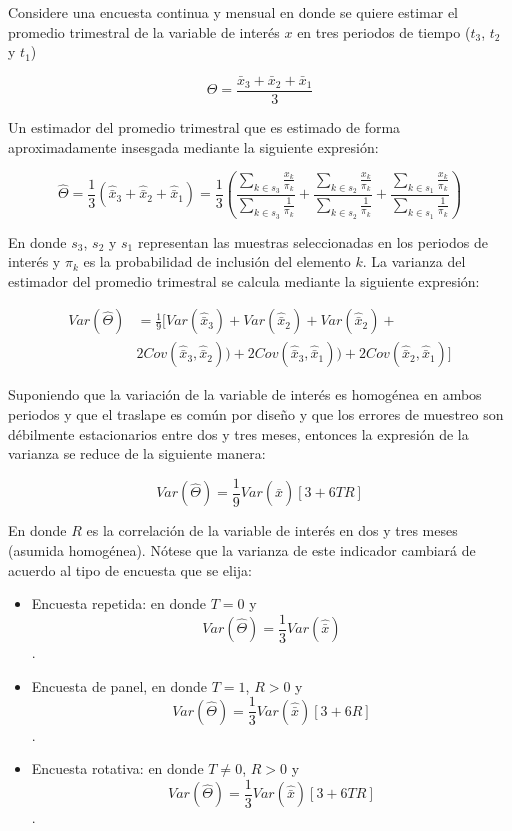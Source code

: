 \documentclass[
  12pt,
  spanish,
]{book}
\providecommand{\tightlist}{%
  \setlength{\itemsep}{0pt}\setlength{\parskip}{0pt}}
\begin{document}
Considere una encuesta continua y mensual en donde se quiere estimar el promedio trimestral de la variable de interés \(x\) en tres periodos de tiempo (\(t_3\), \(t_2\) y \(t_1\))

\[
\Theta = \frac{\bar{x}_3 + \bar{x}_2 + \bar{x}_1}{3}
\]

Un estimador del promedio trimestral que es estimado de forma aproximadamente insesgada mediante la siguiente expresión:

\[
\hat{\Theta} = \frac{1}{3} \left( \hat{\bar{x}}_3 + \hat{\bar{x}}_2 + \hat{\bar{x}}_1 \right)
= \frac{1}{3}\left( \frac{\sum_{k\in s_3}\frac{x_{k}}{\pi_k}}{\sum_{k\in s_3}\frac{1}{\pi_k}} + \frac{\sum_{k\in s_2}\frac{x_{k}}{\pi_k}}{\sum_{k\in s_2}\frac{1}{\pi_k}} + \frac{\sum_{k\in s_1}\frac{x_{k}}{\pi_k}}{\sum_{k\in s_1}\frac{1}{\pi_k}} \right)
\]

En donde \(s_3\), \(s_2\) y \(s_1\) representan las muestras seleccionadas en los periodos de interés y \(\pi_k\) es la probabilidad de inclusión del elemento \(k\). La varianza del estimador del promedio trimestral se calcula mediante la siguiente expresión:

\[
\begin{split}
Var(\hat{\Theta}) & = \frac{1}{9}[Var(\hat{\bar{x}}_3) + Var(\hat{\bar{x}}_2) + Var(\hat{\bar{x}}_2) + \\ 
&2Cov(\hat{\bar{x}}_3, \hat{\bar{x}}_2)) + 2Cov(\hat{\bar{x}}_3, \hat{\bar{x}}_1)) + 2Cov(\hat{\bar{x}}_2, \hat{\bar{x}}_1)]
\end{split}
\]

Suponiendo que la variación de la variable de interés es homogénea en ambos periodos y que el traslape es común por diseño y que los errores de muestreo son débilmente estacionarios entre dos y tres meses, entonces la expresión de la varianza se reduce de la siguiente manera:

\[
Var(\hat{\Theta}) = \frac{1}{9} Var(\hat{\bar{x}})[3 + 6TR]
\]

En donde \(R\) es la correlación de la variable de interés en dos y tres meses (asumida homogénea). Nótese que la varianza de este indicador cambiará de acuerdo al tipo de encuesta que se elija:

\begin{itemize}
\tightlist
\item
  Encuesta repetida: en donde \(T=0\) y
  \[Var(\hat{\Theta}) = \frac{1}{3} Var(\hat{\bar{x}})\].
\item
  Encuesta de panel, en donde \(T=1\), \(R > 0\) y
  \[Var(\hat{\Theta}) = \frac{1}{3} Var(\hat{\bar{x}}) [3+6R]\].
\item
  Encuesta rotativa: en donde \(T\neq 0\), \(R > 0\) y
  \[Var(\hat{\Theta}) = \frac{1}{3} Var(\hat{\bar{x}}) [3+6TR]\].
\end{itemize}
\end{document}
